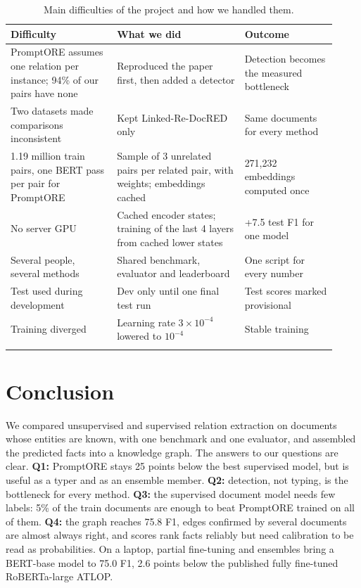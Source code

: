 \documentclass[pdflatex,sn-mathphys-num]{sn-jnl}
\begin{document}
\begin{table}[htbp]
\caption{Main difficulties of the project and how we handled them.}\label{tab:difficulties}
\centering
\small
\begin{tabular}{@{}p{0.3\linewidth}p{0.36\linewidth}p{0.26\linewidth}@{}}
\toprule
Difficulty & What we did & Outcome \\
\midrule
PromptORE assumes one relation per instance; 94\% of our pairs have none & Reproduced the paper first, then added a detector & Detection becomes the measured bottleneck \\
Two datasets made comparisons inconsistent & Kept Linked-Re-DocRED only & Same documents for every method \\
1.19 million train pairs, one BERT pass per pair for PromptORE & Sample of 3 unrelated pairs per related pair, with weights; embeddings cached & 271,232 embeddings computed once \\
No server GPU & Cached encoder states; training of the last 4 layers from cached lower states & +7.5 test F1 for one model \\
Several people, several methods & Shared benchmark, evaluator and leaderboard & One script for every number \\
Test used during development & Dev only until one final test run & Test scores marked provisional \\
Training diverged & Learning rate $3\times10^{-4}$ lowered to $10^{-4}$ & Stable training \\
\botrule
\end{tabular}
\end{table}

\section{Conclusion}\label{sec:conclusion}

We compared unsupervised and supervised relation extraction on documents whose entities are known, with one benchmark and one evaluator, and assembled the predicted facts into a knowledge graph. The answers to our questions are clear. \textbf{Q1:} PromptORE stays 25 points below the best supervised model, but is useful as a typer and as an ensemble member. \textbf{Q2:} detection, not typing, is the bottleneck for every method. \textbf{Q3:} the supervised document model needs few labels: 5\% of the train documents are enough to beat PromptORE trained on all of them. \textbf{Q4:} the graph reaches 75.8 F1, edges confirmed by several documents are almost always right, and scores rank facts reliably but need calibration to be read as probabilities. On a laptop, partial fine-tuning and ensembles bring a BERT-base model to 75.0 F1, 2.6 points below the published fully fine-tuned RoBERTa-large ATLOP.
\end{document}
